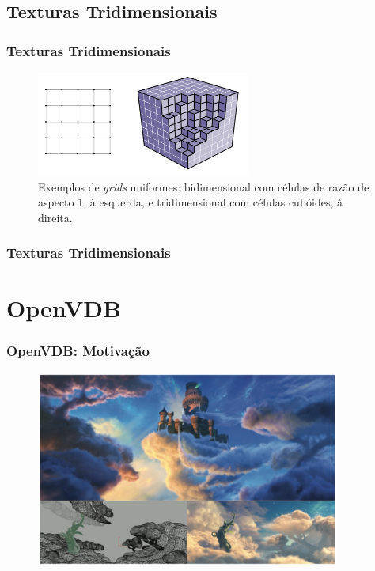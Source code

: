 \documentclass{beamer}
\begin{document}
\subsection{Texturas Tridimensionais}
\begin{frame}

\frametitle{Texturas Tridimensionais}

\begin{figure}[!htb]
\center
\includegraphics[width=7cm]{grid_example}
\caption{Exemplos de \emph{grids} uniformes: bidimensional com células de razão de aspecto 1, à esquerda, e tridimensional com células cubóides, à direita.}
\end{figure}

\end{frame}

\begin{frame}

\frametitle{Texturas Tridimensionais}



\end{frame}



\section{OpenVDB}
\begin{frame}

\frametitle{OpenVDB: Motivação}

\begin{figure}[!htb]
\center
\includegraphics[width=10cm]{puss}
\end{figure}

\end{frame}
\end{document}

